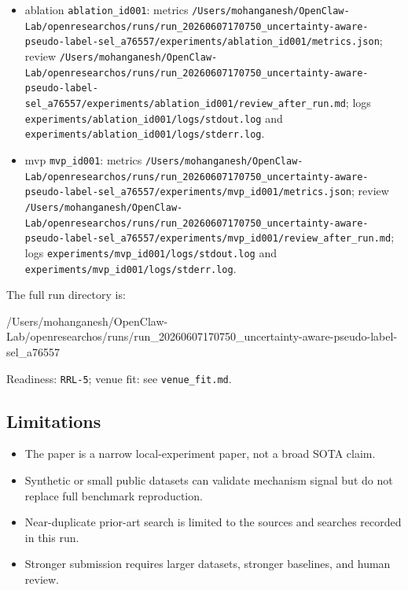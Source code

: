 \documentclass[
  11pt,
]{article}
\newenvironment{Shaded}{}{}
\newcommand{\NormalTok}[1]{#1}
\providecommand{\tightlist}{%
  \setlength{\itemsep}{0pt}\setlength{\parskip}{0pt}}
\begin{document}
\begin{itemize}
\item
  ablation \texttt{ablation\_id001}: metrics \texttt{/Users/mohanganesh/OpenClaw-Lab/openresearchos/runs/run\_20260607170750\_uncertainty-aware-pseudo-label-sel\_a76557/experiments/ablation\_id001/metrics.json}; review \texttt{/Users/mohanganesh/OpenClaw-Lab/openresearchos/runs/run\_20260607170750\_uncertainty-aware-pseudo-label-sel\_a76557/experiments/ablation\_id001/review\_after\_run.md}; logs \texttt{experiments/ablation\_id001/logs/stdout.log} and \texttt{experiments/ablation\_id001/logs/stderr.log}.
\item
  mvp \texttt{mvp\_id001}: metrics \texttt{/Users/mohanganesh/OpenClaw-Lab/openresearchos/runs/run\_20260607170750\_uncertainty-aware-pseudo-label-sel\_a76557/experiments/mvp\_id001/metrics.json}; review \texttt{/Users/mohanganesh/OpenClaw-Lab/openresearchos/runs/run\_20260607170750\_uncertainty-aware-pseudo-label-sel\_a76557/experiments/mvp\_id001/review\_after\_run.md}; logs \texttt{experiments/mvp\_id001/logs/stdout.log} and \texttt{experiments/mvp\_id001/logs/stderr.log}.
\end{itemize}

The full run directory is:

\begin{Shaded}
\begin{Highlighting}[]
\NormalTok{/Users/mohanganesh/OpenClaw{-}Lab/openresearchos/runs/run\_20260607170750\_uncertainty{-}aware{-}pseudo{-}label{-}sel\_a76557}
\end{Highlighting}
\end{Shaded}

Readiness: \texttt{RRL-5}; venue fit: see \texttt{venue\_fit.md}.

\subsection{Limitations}\label{limitations}

\begin{itemize}
\tightlist
\item
  The paper is a narrow local-experiment paper, not a broad SOTA claim.
\item
  Synthetic or small public datasets can validate mechanism signal but do not replace full benchmark reproduction.
\item
  Near-duplicate prior-art search is limited to the sources and searches recorded in this run.
\item
  Stronger submission requires larger datasets, stronger baselines, and human review.
\end{itemize}
\end{document}
